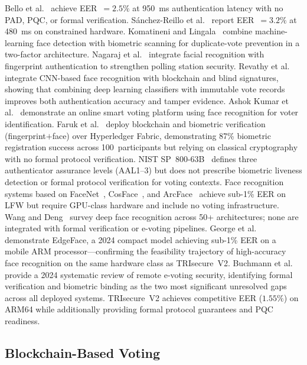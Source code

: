 \documentclass[pdflatex,sn-mathphys-num]{sn-jnl}%
\theoremstyle{thmstyleone}%
\theoremstyle{thmstyletwo}%
\theoremstyle{thmstylethree}%
\begin{document}
Bello et al.~\cite{bello2021biometric} achieve EER~\(=2.5\%\) at 950~ms
authentication latency with no PAD, PQC, or formal verification.
S\'{a}nchez-Reillo et al.~\cite{sanchez2020biometric} report EER~\(=3.2\%\)
at 480~ms on constrained hardware. Komatineni and
Lingala~\cite{komatineni2020biometric} combine machine-learning face detection
with biometric scanning for duplicate-vote prevention in a two-factor
architecture. Nagaraj et al.~\cite{nagaraj2022voting} integrate facial
recognition with fingerprint authentication to strengthen polling station
security. Revathy et al.~\cite{revathy2022cnn_evoting} integrate CNN-based
face recognition with blockchain and blind signatures, showing that combining
deep learning classifiers with immutable vote records improves both
authentication accuracy and tamper evidence. Ashok Kumar et
al.~\cite{ashokkumar2023smart} demonstrate an online smart voting platform
using face recognition for voter identification. Faruk et
al.~\cite{faruk2024transforming} deploy blockchain and biometric verification
(fingerprint\(+\)face) over Hyperledger Fabric, demonstrating 87\% biometric
registration success across 100~participants but relying on classical
cryptography with no formal protocol verification. NIST
SP~800-63B~\cite{nist_sp800_63b} defines three authenticator assurance levels
(AAL1--3) but does not prescribe biometric liveness detection or formal
protocol verification for voting contexts. Face recognition systems based on
FaceNet~\cite{schroff2015facenet}, CosFace~\cite{wang2018cosface}, and
ArcFace~\cite{deng2019arcface} achieve sub-1\% EER on LFW but require
GPU-class hardware and include no voting infrastructure. Wang and
Deng~\cite{wang2021face} survey deep face recognition across 50+ architectures;
none are integrated with formal verification or e-voting pipelines. George et
al.~\cite{george2024adaptive_biometric} demonstrate EdgeFace, a 2024 compact
model achieving sub-1\% EER on a mobile ARM processor---confirming the
feasibility trajectory of high-accuracy face recognition on the same hardware
class as TRIsecure~V2. Buchmann et al.~\cite{buchmann2024pvoting} provide a
2024 systematic review of remote e-voting security, identifying formal
verification and biometric binding as the two most significant unresolved gaps
across all deployed systems. TRIsecure~V2 achieves competitive EER
(\(1.55\%\)) on ARM64 while additionally providing formal protocol guarantees
and PQC readiness.

\subsection{Blockchain-Based Voting}
\end{document}
